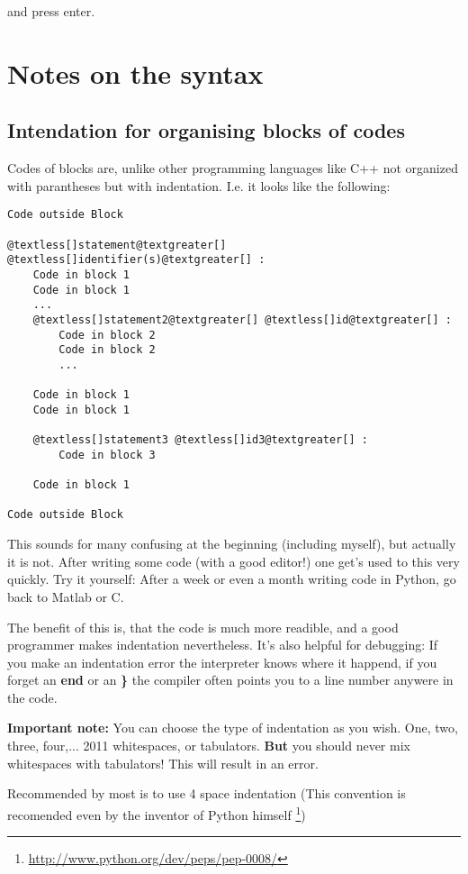\documentclass[letterpaper,10pt,english]{manual}
\begin{document}
and press enter.


\section{Notes on the syntax}


\hypertarget{indention-ref}{}\subsection{Intendation for organising blocks of codes}

Codes of blocks are, unlike other programming languages like C++
not organized with parantheses but with indentation. I.e. it looks
like the following:

\begin{Verbatim}[commandchars=@\[\]]
Code outside Block

@textless[]statement@textgreater[] @textless[]identifier(s)@textgreater[] :
    Code in block 1
    Code in block 1
    ...
    @textless[]statement2@textgreater[] @textless[]id@textgreater[] :
        Code in block 2
        Code in block 2
        ...

    Code in block 1
    Code in block 1

    @textless[]statement3 @textless[]id3@textgreater[] :
        Code in block 3

    Code in block 1

Code outside Block
\end{Verbatim}

This sounds for many confusing at the beginning (including myself),
but actually it is not.
After writing some code (with a good editor!) one get's
used to this very quickly.
Try it yourself: After a week or even a month
writing code in Python, go back to Matlab or C.

The benefit of this is, that the code is much more readible,
and a good programmer makes indentation nevertheless.
It's also helpful for debugging: If you make an indentation error
the interpreter knows where it happend, if you forget an \textbf{end} or
an \textbf{\}} the compiler often points you to a line number anywere in the code.

\textbf{Important note:} You can choose the type of indentation as you wish.
One, two, three, four,... 2011 whitespaces, or tabulators. \textbf{But} you should
never mix whitespaces with tabulators! This will result in an error.

Recommended by most  is to use 4
space indentation (This convention is recomended even by the inventor
of Python himself \footnote{
\href{http://www.python.org/dev/peps/pep-0008/}{http://www.python.org/dev/peps/pep-0008/}
})
\end{document}
